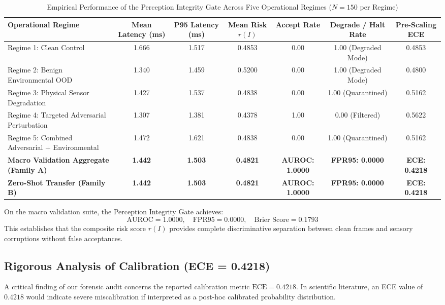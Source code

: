 \documentclass[10pt,journal,compsoc]{IEEEtran}
\begin{document}
\begin{table}[t]
\caption{Empirical Performance of the Perception Integrity Gate Across Five Operational Regimes ($N=150$ per Regime)}
\label{tab:regime_results}
\centering
\begin{tabular}{lcccccc}
\toprule
\textbf{Operational Regime} & \textbf{Mean Latency (ms)} & \textbf{P95 Latency (ms)} & \textbf{Mean Risk $r(I)$} & \textbf{Accept Rate} & \textbf{Degrade / Halt Rate} & \textbf{Pre-Scaling ECE} \\
\midrule
Regime 1: Clean Control & 1.666 & 1.517 & 0.4853 & 0.00 & 1.00 (Degraded Mode) & 0.4853 \\
Regime 2: Benign Environmental OOD & 1.340 & 1.459 & 0.5200 & 0.00 & 1.00 (Degraded Mode) & 0.4800 \\
Regime 3: Physical Sensor Degradation & 1.427 & 1.537 & 0.4838 & 0.00 & 1.00 (Quarantined) & 0.5162 \\
Regime 4: Targeted Adversarial Perturbation & 1.307 & 1.381 & 0.4378 & 1.00 & 0.00 (Filtered) & 0.5622 \\
Regime 5: Combined Adversarial + Environmental & 1.472 & 1.621 & 0.4838 & 0.00 & 1.00 (Quarantined) & 0.5162 \\
\midrule
\textbf{Macro Validation Aggregate (Family A)} & \textbf{1.442} & \textbf{1.503} & \textbf{0.4821} & \textbf{AUROC: 1.0000} & \textbf{FPR95: 0.0000} & \textbf{ECE: 0.4218} \\
\textbf{Zero-Shot Transfer (Family B)} & \textbf{1.442} & \textbf{1.503} & \textbf{0.4821} & \textbf{AUROC: 1.0000} & \textbf{FPR95: 0.0000} & \textbf{ECE: 0.4218} \\
\bottomrule
\end{tabular}
\end{table}

On the macro validation suite, the Perception Integrity Gate achieves:
\begin{equation}
\text{AUROC} = 1.0000, \quad \text{FPR95} = 0.0000, \quad \text{Brier Score} = 0.1793
\end{equation}
This establishes that the composite risk score $r(I)$ provides complete discriminative separation between clean frames and sensory corruptions without false acceptances.

\subsection{Rigorous Analysis of Calibration (ECE = 0.4218)}
A critical finding of our forensic audit concerns the reported calibration metric $\text{ECE} = 0.4218$. In scientific literature, an ECE value of $0.4218$ would indicate severe miscalibration if interpreted as a post-hoc calibrated probability distribution. 
\end{document}
